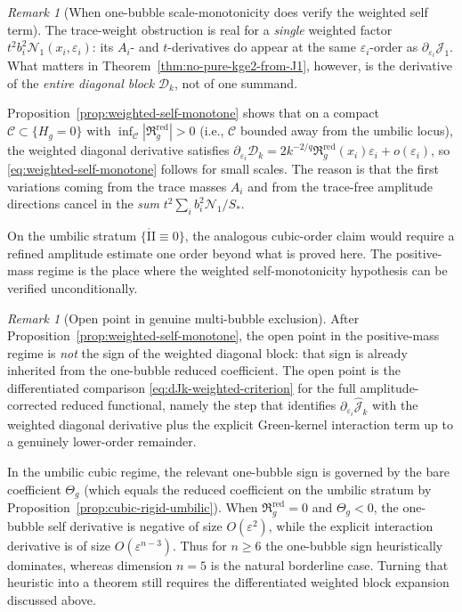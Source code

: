 \documentclass[11pt,reqno,a4paper]{amsart}
\numberwithin{equation}{section}
\theoremstyle{plain}
\theoremstyle{remark}
\newtheorem{remark}[theorem]{Remark}
\theoremstyle{plain}
\begin{document}
\begin{remark}[When one-bubble scale-monotonicity does verify the weighted self term]
\label{rem:J1-barrier-when}
The trace-weight obstruction is real for a \emph{single} weighted factor
$t^2b_i^2\mathcal N_1(x_i,\varepsilon_i)$: its $A_i$- and $t$-derivatives do appear
at the same $\varepsilon_i$-order as $\partial_{\varepsilon_i}\mathcal J_1$.
What matters in Theorem~\ref{thm:no-pure-kge2-from-J1}, however, is the derivative of
the \emph{entire diagonal block} $\mathcal D_k$, not of one summand.

Proposition~\ref{prop:weighted-self-monotone} shows that on a compact
$\mathcal C\subset\{H_g=0\}$ with
$\inf_{\mathcal C}|\mathfrak R_g^{\mathrm{red}}|>0$
(i.e., $\mathcal C$ bounded away from the umbilic locus),
the weighted diagonal derivative satisfies
$\partial_{\varepsilon_i}\mathcal D_k
=2k^{-2/q}\mathfrak R_g^{\mathrm{red}}(x_i)\varepsilon_i+o(\varepsilon_i)$,
so \eqref{eq:weighted-self-monotone} follows for small scales.
The reason is that the first variations coming from the trace masses $A_i$ and
from the trace-free amplitude directions cancel in the \emph{sum}
$t^2\sum_i b_i^2\mathcal N_1/S_\ast$.

On the umbilic stratum $\{\mathring{\mathrm{II}}\equiv0\}$, the analogous cubic-order
claim would require a refined amplitude estimate one order beyond what is proved here.
The positive-mass regime is the place where the weighted self-monotonicity
hypothesis can be verified unconditionally.
\end{remark}

\begin{remark}[Open point in genuine multi-bubble exclusion]
\label{rem:genuine-kge2-open}
After Proposition~\ref{prop:weighted-self-monotone}, the open point in the
positive-mass regime is \emph{not} the sign of the weighted diagonal block:
that sign is already inherited from the one-bubble reduced coefficient.
The open point is the differentiated comparison
\eqref{eq:dJk-weighted-criterion} for the full amplitude-corrected reduced functional,
namely the step that identifies
$\partial_{\varepsilon_i}\hat{\mathcal J}_k$
with the weighted diagonal derivative plus the explicit Green-kernel interaction term
up to a genuinely lower-order remainder.

In the umbilic cubic regime, the relevant one-bubble sign is governed by the
bare coefficient $\Theta_g$ (which equals the reduced coefficient on the umbilic stratum
by Proposition~\ref{prop:cubic-rigid-umbilic}).
When $\mathfrak R_g^{\mathrm{red}}=0$ and $\Theta_g<0$, the one-bubble
self derivative is negative of size $O(\varepsilon^2)$, while the explicit interaction
derivative is of size $O(\varepsilon^{n-3})$. Thus for $n\ge6$ the one-bubble sign
heuristically dominates, whereas dimension $n=5$ is the natural borderline case.
Turning that heuristic into a theorem still requires the differentiated weighted block
expansion discussed above.
\end{remark}
\end{document}
